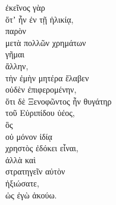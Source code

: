 {\large
\begin{greek}
\noindent ἐκεῖνος γὰρ \\
\tabto{2em} ὅτʼ ἦν ἐν τῇ ἡλικίᾳ, \\
παρὸν \\
\tabto{4em} μετὰ πολλῶν χρημάτων \\
\tabto{2em} γῆμαι \\
\tabto{4em} ἄλλην, \\
τὴν ἐμὴν μητέρα ἔλαβεν \\
\tabto{2em} οὐδὲν ἐπιφερομένην, \\
ὅτι δὲ Ξενοφῶντος ἦν θυγάτηρ \\
\tabto{2em} τοῦ Εὐριπίδου ὑέος, \\
\tabto{2em} ὃς \\
\tabto{4em} οὐ μόνον ἰδίᾳ \\
\tabto{4em} χρηστὸς ἐδόκει εἶναι, \\
\tabto{4em} ἀλλὰ καὶ \\
\tabto{6em} στρατηγεῖν αὐτὸν \\
\tabto{4em} ἠξιώσατε, \\
\tabto{6em} ὡς ἐγὼ ἀκούω.

\end{greek}
}

